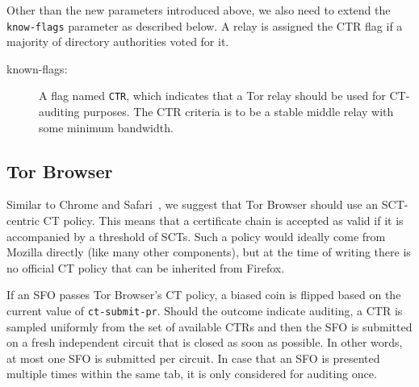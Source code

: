 Other than the new parameters introduced above, we also need to extend the
\texttt{know-flags} parameter as described below.  A relay is assigned the CTR
flag if a majority of directory authorities voted for it.
\begin{description}
	\item[known-flags:] A flag named \texttt{CTR}, which indicates
		that a Tor relay should be used for CT-auditing purposes.  The CTR
		criteria is to be a stable middle relay with some minimum bandwidth.
\end{description}

\subsection{Tor Browser}
Similar to Chrome and Safari~\cite{chrome-policy,safari-policy}, we suggest that
Tor Browser should use an SCT-centric CT policy.  This means that a certificate
chain is accepted as valid if it is accompanied by a threshold of SCTs.  Such a
policy would ideally come from Mozilla directly (like many other components),
but at the time of writing there is no official CT policy that can be inherited
from Firefox.

If an SFO passes Tor Browser's CT policy, a biased coin is flipped based on the
current value of \texttt{ct-submit-pr}.  Should the outcome indicate auditing,
a CTR is sampled uniformly from the set of available CTRs and then the SFO is
submitted on a fresh independent circuit that is closed as soon as possible.  In
other words, at most one SFO is submitted per circuit.  In case that an SFO is
presented multiple times within the same tab, it is only considered for auditing
once.

%
%


